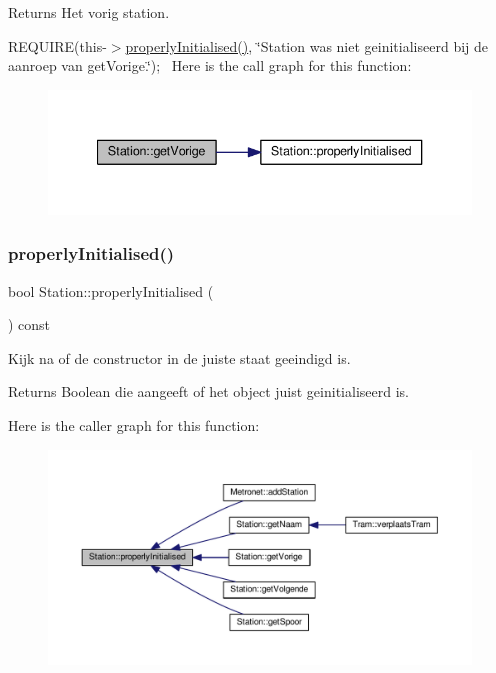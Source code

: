 \begin{DoxyReturn}{Returns}
Het vorig station.
\end{DoxyReturn}
R\+E\+Q\+U\+I\+RE(this-\/$>$\hyperlink{class_station_a9ce626dd0599e3ea8107404a59c21e16}{properly\+Initialised()}, \char`\"{}\+Station was niet geinitialiseerd bij de aanroep van get\+Vorige.\char`\"{});~\newline
Here is the call graph for this function\+:
\nopagebreak
\begin{figure}[H]
\begin{center}
\leavevmode
\includegraphics[width=340pt]{class_station_a69c0539e899ff540c38eb434a69bfa9e_cgraph}
\end{center}
\end{figure}
\mbox{\label{class_station_a9ce626dd0599e3ea8107404a59c21e16}} 
\subsubsection{\texorpdfstring{properly\+Initialised()}{properlyInitialised()}}
{\footnotesize\ttfamily bool Station\+::properly\+Initialised (\begin{DoxyParamCaption}{ }\end{DoxyParamCaption}) const}



Kijk na of de constructor in de juiste staat geeindigd is. 

\begin{DoxyReturn}{Returns}
Boolean die aangeeft of het object juist geinitialiseerd is. 
\end{DoxyReturn}
Here is the caller graph for this function\+:
\nopagebreak
\begin{figure}[H]
\begin{center}
\leavevmode
\includegraphics[width=350pt]{class_station_a9ce626dd0599e3ea8107404a59c21e16_icgraph}
\end{center}
\end{figure}


